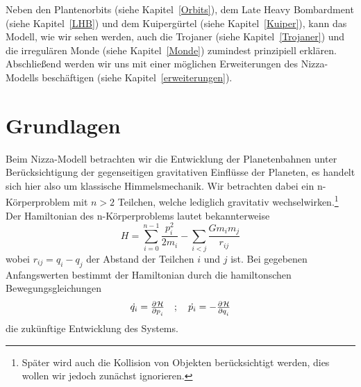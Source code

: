 \documentclass[12pt,a4paper,twoside]{article}
\newcommand{\refsec}[1]{siehe Kapitel~\ref{#1}}
\begin{document}
Neben den Plantenorbits (\refsec{Orbits}), dem Late Heavy Bombardment (\refsec{LHB}) und dem Kuipergürtel (\refsec{Kuiper}), kann das Modell, wie wir sehen werden, auch die Trojaner (\refsec{Trojaner}) und die irregulären Monde (\refsec{Monde}) zumindest prinzipiell erklären.
Abschließend werden wir uns mit einer möglichen Erweiterungen des Nizza-Modells beschäftigen (\refsec{erweiterungen}).

\FloatBarrier
\section{Grundlagen}
Beim Nizza-Modell betrachten wir die Entwicklung der Planetenbahnen unter Be\-rück\-sich\-ti\-gung der gegenseitigen gravitativen Einflüsse der Planeten, es handelt sich hier also um klassische Himmelsmechanik. %
Wir betrachten dabei ein n-Körperproblem mit $n>2$ Teilchen, welche lediglich gravitativ wechselwirken.\footnote{Später wird auch die Kollision von Objekten berücksichtigt werden, dies wollen wir jedoch zunächst ignorieren.}
Der Hamiltonian des n-Körperproblems lautet bekannterweise
\begin{equation}\label{eq:nbodyhamilton}
H = \sum\limits_{i=0}^{n-1} \frac{p_i^2}{2m_i} - \sum\limits_{i<j} \frac{Gm_im_j}{r_{ij}}
\end{equation}
wobei $r_{ij}=q_i-q_j$ der Abstand der Teilchen $i$ und $j$ ist. %
Bei gegebenen Anfangswerten bestimmt der Hamiltonian durch die hamiltonschen Bewegungsgleichungen
\begin{equation}
\dot{q_i} = \pd{\mathcal H}{p_i} \quad ; \quad \dot{p_i} = - \pd{\mathcal H}{q_i}
\end{equation}
die zukünftige Entwicklung des Systems.
\end{document}
